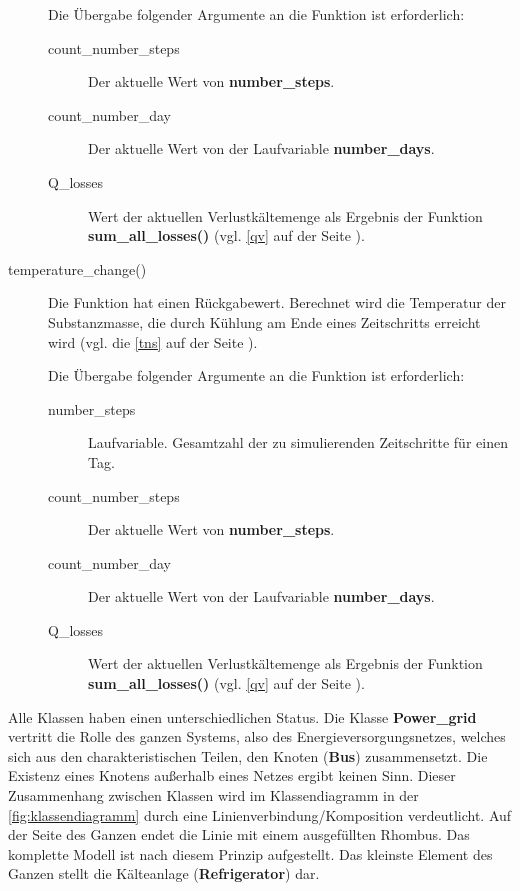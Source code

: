 \begin{description}
	Die \"Ubergabe folgender Argumente an die Funktion ist erforderlich:
	\begin{description}
		\item[count\_number\_steps] Der aktuelle Wert von
		\textbf{number\_steps}.
		\item[count\_number\_day] Der aktuelle Wert von der Laufvariable
		\textbf{number\_days}.
		\item[Q\_losses] Wert der aktuellen Verlustk\"altemenge als
		Ergebnis der Funktion \textbf{sum\_all\_losses()} (vgl.
		\cref{qv} auf der Seite \pageref{qv}).
	\end{description}
	\item[temperature\_change()] Die Funktion hat einen R\"uckgabewert.
	Berechnet wird die Temperatur der Substanzmasse, die durch K\"uhlung am
	Ende eines Zeitschritts erreicht wird (vgl. die \cref{tns} auf der
	Seite \pageref{tns}).
	
	Die \"Ubergabe folgender Argumente an die Funktion ist erforderlich:
	\begin{description}
		\item[number\_steps] Laufvariable. Gesamtzahl der zu
		simulierenden Zeitschritte f\"ur einen Tag.
		\item[count\_number\_steps] Der aktuelle Wert von
		\textbf{number\_steps}.
		\item[count\_number\_day] Der aktuelle Wert von der Laufvariable
		\textbf{number\_days}.
		\item[Q\_losses] Wert der aktuellen Verlustk\"altemenge als
		Ergebnis der Funktion \textbf{sum\_all\_losses()} (vgl.
		\cref{qv} auf der Seite \pageref{qv}).
	\end{description}
\end{description}

Alle Klassen haben einen unterschiedlichen Status. Die Klasse
\textbf{Power\_grid} vertritt die Rolle des ganzen Systems, also des
Energieversorgungsnetzes, welches sich aus den charakteristischen Teilen, den
Knoten (\textbf{Bus}) zusammensetzt. Die Existenz eines Knotens au\ss erhalb
eines Netzes ergibt keinen Sinn. Dieser Zusammenhang zwischen Klassen wird im
Klassendiagramm in der \cref{fig:klassendiagramm} durch eine
Linienverbindung/Komposition verdeutlicht.  Auf der Seite des Ganzen endet die
Linie mit einem ausgef\"ullten Rhombus. Das komplette Modell ist nach diesem
Prinzip aufgestellt. Das kleinste Element des Ganzen stellt die K\"alteanlage
(\textbf{Refrigerator}) dar.

